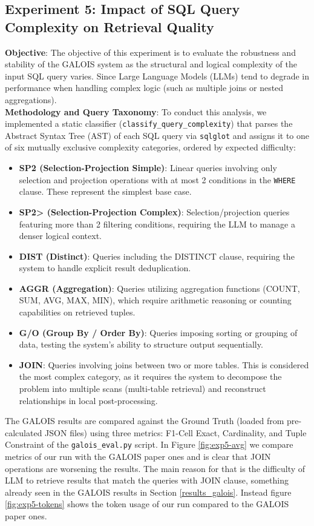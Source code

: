\subsection{Experiment 5: Impact of SQL Query Complexity on Retrieval Quality}
\textbf{Objective}: The objective of this experiment is to evaluate the robustness and stability of the GALOIS system as the structural and logical complexity of the input SQL query varies. Since Large Language Models (LLMs) tend to degrade in performance when handling complex logic (such as multiple joins or nested aggregations).
\\\textbf{Methodology and Query Taxonomy}: To conduct this analysis, we implemented a static classifier (\texttt{classify\_query\_complexity}) that parses the Abstract Syntax Tree (AST) of each SQL query via \texttt{sqlglot} and assigns it to one of six mutually exclusive complexity categories, ordered by expected difficulty:
\begin{itemize}
    \item \textbf{SP2 (Selection-Projection Simple)}: Linear queries involving only selection and projection operations with at most 2 conditions in the \texttt{WHERE} clause. These represent the simplest base case.
    \item \textbf{SP2> (Selection-Projection Complex)}: Selection/projection queries featuring more than 2 filtering conditions, requiring the LLM to manage a denser logical context.
    \item \textbf{DIST (Distinct)}: Queries including the DISTINCT clause, requiring the system to handle explicit result deduplication.
    \item \textbf{AGGR (Aggregation)}: Queries utilizing aggregation functions (COUNT, SUM, AVG, MAX, MIN), which require arithmetic reasoning or counting capabilities on retrieved tuples.
    \item \textbf{G/O (Group By / Order By)}: Queries imposing sorting or grouping of data, testing the system's ability to structure output sequentially.
    \item \textbf{JOIN}: Queries involving joins between two or more tables. This is considered the most complex category, as it requires the system to decompose the problem into multiple scans (multi-table retrieval) and reconstruct relationships in local post-processing.
\end{itemize}
The GALOIS results are compared against the Ground Truth (loaded from pre-calculated JSON files) using three metrics: F1-Cell Exact, Cardinality, and Tuple Constraint of the \texttt{galois\_eval.py} script.
In Figure \ref{fig:exp5-avg} we compare metrics of our run with the GALOIS paper ones and is clear that JOIN operations are worsening the results.
The main reason for that is the difficulty of LLM to retrieve results that match the queries with JOIN clause, something already seen in the GALOIS results in Section \ref{results_galois}.
Instead figure \ref{fig:exp5-tokens} shows the token usage of our run compared to the GALOIS paper ones.


